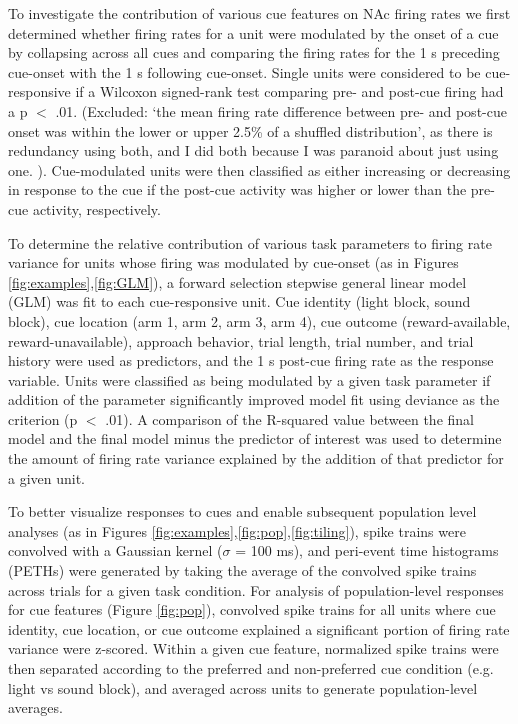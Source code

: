 \documentclass[11pt]{article}
\begin{document}
To investigate the contribution of various cue features on NAc firing rates we first determined whether firing rates for a unit were modulated by the onset of a cue by collapsing across all cues and comparing the firing rates for the 1 s preceding cue-onset with the 1 s following cue-onset. Single units were considered to be cue-responsive if a Wilcoxon signed-rank test comparing pre- and post-cue firing had a p $<$ .01. (Excluded: ‘the mean firing rate difference between pre- and post-cue onset was within the lower or upper 2.5\% of a shuffled distribution’, as there is redundancy using both, and I did both because I was paranoid about just using one. ). Cue-modulated units were then classified as either increasing or decreasing in response to the cue if the post-cue activity was higher or lower than the pre-cue activity, respectively.

To determine the relative contribution of various task parameters to firing rate variance for units whose firing was modulated by cue-onset (as in Figures \ref{fig:examples},\ref{fig:GLM}), a forward selection stepwise general linear model (GLM) was fit to each cue-responsive unit. Cue identity (light block, sound block), cue location (arm 1, arm 2, arm 3, arm 4), cue outcome (reward-available, reward-unavailable), approach behavior, trial length, trial number, and trial history were used as predictors, and the 1 s post-cue firing rate as the response variable. Units were classified as being modulated by a given task parameter if addition of the parameter significantly improved model fit using deviance as the criterion (p $<$ .01). A comparison of the R-squared value between the final model and the final model minus the predictor of interest was used to determine the amount of firing rate variance explained by the addition of that predictor for a given unit.

To better visualize responses to cues and enable subsequent population level analyses (as in Figures \ref{fig:examples},\ref{fig:pop},\ref{fig:tiling}), spike trains were convolved with a Gaussian kernel ($\sigma$ = 100 ms), and peri-event time histograms (PETHs) were generated by taking the average of the convolved spike trains across trials for a given task condition. For analysis of population-level responses for cue features (Figure \ref{fig:pop}), convolved spike trains for all units where cue identity, cue location, or cue outcome explained a significant portion of firing rate variance were z-scored. Within a given cue feature, normalized spike trains were then separated according to the preferred and non-preferred cue condition (e.g. light vs sound block), and averaged across units to generate population-level averages.
\end{document}
